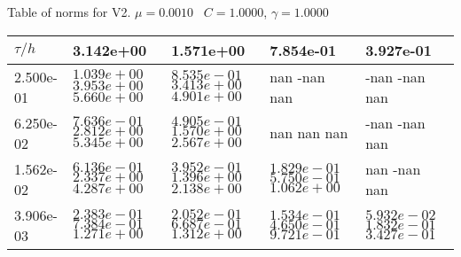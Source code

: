 \begin{center}
Table of norms for V2. $\mu = 0.0010$ \, $C = 1.0000$, $\gamma = 1.0000$
  
\begin{tabular}{|p{1in}|p{1in}|p{1in}|p{1in}|p{1in}|} \hline
$\tau / h$ &3.142e+00 &1.571e+00 &7.854e-01 &3.927e-01 \\ \hline 
2.500e-01 & $1.039e+00$  $3.953e+00$  $5.660e+00$  & $8.535e-01$  $3.413e+00$  $4.901e+00$  & nan -nan nan  & -nan -nan nan  \\ \hline 
6.250e-02 & $7.636e-01$  $2.812e+00$  $5.345e+00$  & $4.905e-01$  $1.570e+00$  $2.567e+00$  & nan nan nan  & -nan -nan nan  \\ \hline 
1.562e-02 & $6.136e-01$  $2.337e+00$  $4.287e+00$  & $3.952e-01$  $1.396e+00$  $2.138e+00$  & $1.829e-01$  $5.750e-01$  $1.062e+00$  & nan -nan nan \\ \hline 
3.906e-03 & $2.383e-01$  $7.384e-01$  $1.271e+00$  & $2.052e-01$  $6.687e-01$  $1.312e+00$  & $1.534e-01$  $4.650e-01$  $9.721e-01$  & $5.932e-02$  $1.832e-01$  $3.427e-01$  \\ \hline 

\end{tabular}\\[20pt]
\end{center}
